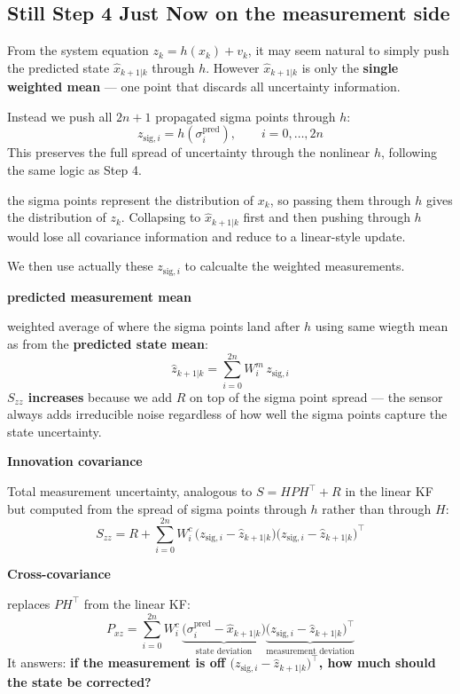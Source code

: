 \documentclass[12pt, a4paper]{article}
\begin{document}
\subsection*{Still Step 4 Just Now on the measurement side}

From the system equation $z_k = h(x_k) + v_k$, it may seem natural to simply
push the predicted state $\hat{x}_{k+1|k}$ through $h$. However
$\hat{x}_{k+1|k}$ is only the \textbf{single weighted mean} --- one point
that discards all uncertainty information.

Instead we push all $2n+1$ propagated sigma points through $h$:
\[
  z_{\text{sig},i} = h(\sigma_i^{\text{pred}}), \qquad i = 0,\ldots,2n
\]
This preserves the full spread of uncertainty through the nonlinear $h$,
following the same logic as Step 4.
\begin{notebox}
the sigma points represent the
distribution of $x_k$, so passing them through $h$ gives the distribution
of $z_k$. Collapsing to $\hat{x}_{k+1|k}$ first and then pushing through
$h$ would lose all covariance information and reduce to a linear-style update.
\end{notebox}

We then use actually these $z_{\text{sig},i}$ to calcualte the weighted measurements.

\textbf{predicted measurement mean}

weighted average of where the sigma points land after $h$ using same wiegth mean as from the \textbf{predicted state mean}:
\[
  \hat{z}_{k+1|k} = \sum_{i=0}^{2n} W_i^m\, z_{\text{sig},i}
\]
\textbf{$S_{zz}$ increases} because we add $R$ on top of the sigma point
spread --- the sensor always adds irreducible noise regardless of how well
the sigma points capture the state uncertainty.


\textbf{Innovation covariance}

Total measurement uncertainty, analogous to $S = HPH^\top + R$ in the linear KF but computed from the spread of
sigma points through $h$ rather than through $H$:
\[
  S_{zz} = R + \sum_{i=0}^{2n} W_i^c\,
    \bigl(z_{\text{sig},i} - \hat{z}_{k+1|k}\bigr)
    \bigl(z_{\text{sig},i} - \hat{z}_{k+1|k}\bigr)^\top
\]

\textbf{Cross-covariance}

replaces $PH^\top$ from the linear KF:
\[
  P_{xz} = \sum_{i=0}^{2n} W_i^c\,
    \underbrace{\bigl(\sigma_i^{\text{pred}} - \hat{x}_{k+1|k}\bigr)}_{\text{state deviation}}
    \underbrace{\bigl(z_{\text{sig},i} - \hat{z}_{k+1|k}\bigr)^\top}_{\text{measurement deviation}}
\]
It answers: \textbf{if the measurement is off $\bigl(z_{\text{sig},i} - \hat{z}_{k+1|k}\bigr)^\top$, how much should the state be corrected?}
\end{document}
